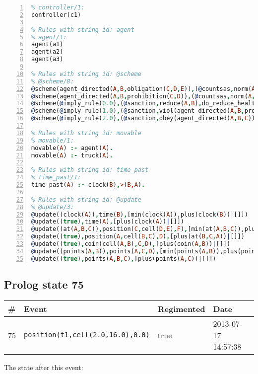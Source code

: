 \documentclass[11pt]{article}\usepackage[utf8]{inputenc}\usepackage{geometry}
\begin{document}
\begin{lstlisting}[language=Prolog, numbers=left]
% Rules with string id: controller
% controller/1:
controller(c1)

% Rules with string id: agent
% agent/1:
agent(a1)
agent(a2)
agent(a3)

% Rules with string id: @scheme
% @scheme/8:
@scheme(agent_directed(A,B,obligation(C,D,E)),(@countsas,norm(A,B,F,obligation(C,D,E)),F),false,(listTrue(C)),(time_past(D)),false,[plus(viol(agent_directed(A,B,obligation(C,D,E))))|[]],[plus(obey(agent_directed(A,B,obligation(C,D,E))))|[]])
@scheme(agent_directed(A,B,prohibition(C,D)),(@countsas,norm(A,B,E,prohibition(C,D)),E),(listTrue(C)),false,(false),false,[plus(viol(agent_directed(A,B,prohibition(C,D))))|[]],[plus(obey(agent_directed(A,B,prohibition(C,D))))|[]])
@scheme(@imply_rule(0.0),(@sanction,reduce(A,B),do_reduce_health(A,B),notifyAgent(A,changed(status))),true,false,false,false,[min(reduce(A,B))|[]],[])
@scheme(@imply_rule(1.0),(@sanction,viol(agent_directed(A,B,prohibition(C,D))),do_sanction(D)),true,false,false,false,[min(viol(agent_directed(A,B,prohibition(C,D))))|[]],[])
@scheme(@imply_rule(2.0),(@sanction,obey(agent_directed(A,B,C))),true,false,false,false,[min(obey(agent_directed(A,B,C)))|[]],[])

% Rules with string id: movable
% movable/1:
movable(A) :- agent(A).
movable(A) :- truck(A).

% Rules with string id: time_past
% time_past/1:
time_past(A) :- clock(B),>(B,A).

% Rules with string id: @update
% @update/3:
@update((clock(A)),time(B),[min(clock(A)),plus(clock(B))|[]])
@update((true),time(A),[plus(clock(A))|[]])
@update((at(A,B,C)),position(C,cell(D,E),F),[min(at(A,B,C)),plus(at(D,E,C))|[]])
@update((true),position(A,cell(B,C),D),[plus(at(B,C,A))|[]])
@update((true),coin(cell(A,B),C,D),[plus(coin(A,B))|[]])
@update((points(A,B)),points(A,C,D),[min(points(A,B)),plus(points(A,D))|[]])
@update((true),points(A,B,C),[plus(points(A,C))|[]])

\end{lstlisting}
\clearpage 
\subsection{Prolog state 75}
\begin{table}[ht]
\centering 
\begin{tabular}{l l l l} 
\textbf{\#} & \textbf{Event} & \textbf{Regimented} & \textbf{Date} \\ [0.5ex] 
\hline
75&\texttt{position(t1,cell(2.0,16.0),0.0)}&true&2013-07-17 14:57:38\\ [1ex] \hline\end{tabular}
\end{table}
The state after this event:
\end{document}
